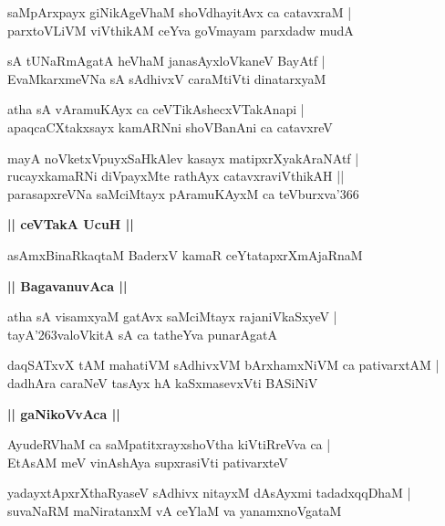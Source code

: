 \documentclass[twoside,12pt,openright]{book}
\def\S{\char'263}
\newcounter{shloka}[chapter]
\def\uvaca#1{\centerline{{\large\textbf{#1}}}}
\begin{document}
\begin{shloka}%
saMpArxpayx giNikAgeVhaM shoVdhayitAvx ca catavxraM |\\
parxtoVLiVM viVthikAM ceYva goVmayam parxdadw mudA
\end{shloka}

\begin{shloka}%
sA tUNaRmAgatA heVhaM janasAyxloVkaneV BayAtf |\\
EvaMkarxmeVNa sA sAdhivxV caraMtiVti dinatarxyaM 
\end{shloka}

\begin{shloka}%
atha sA vAramuKAyx ca ceVTikAshecxVTakAnapi |\\
apaqcaCXtakxsayx kamARNni shoVBanAni ca catavxreV 
\end{shloka}

\begin{shloka}%
mayA noVketxVpuyxSaHkAlev kasayx matipxrXyakAraNAtf |\\
rucayxkamaRNi diVpayxMte rathAyx catavxraviVthikAH ||\\
parasapxreVNa saMciMtayx pAramuKAyxM ca teVburxva\char'366
\end{shloka}

\uvaca{|| ceVTakA UcuH ||}

\begin{shloka}%
asAmxBinaRkaqtaM BaderxV kamaR ceYtatapxrXmAjaRnaM 
\end{shloka}

\uvaca{|| BagavanuvAca ||}

\begin{shloka}%
atha sA visamxyaM gatAvx saMciMtayx rajaniVkaSxyeV |\\
tayA\S valoVkitA sA ca tatheYva punarAgatA
\end{shloka}

\begin{shloka}%
daqSATxvX tAM mahatiVM sAdhivxVM bArxhamxNiVM ca pativarxtAM |\\
dadhAra caraNeV tasAyx hA kaSxmasevxVti BASiNiV 
\end{shloka}

\uvaca{|| gaNikoVvAca ||}

\begin{shloka}%
AyudeRVhaM ca saMpatitxrayxshoVtha kiVtiRreVva ca |\\
EtAsAM meV vinAshAya supxrasiVti pativarxteV 
\end{shloka}

\begin{shloka}%
yadayxtApxrXthaRyaseV sAdhivx nitayxM dAsAyxmi tadadxqqDhaM |\\
suvaNaRM maNiratanxM vA ceYlaM va yanamxnoVgataM 
\end{shloka}
\end{document}
